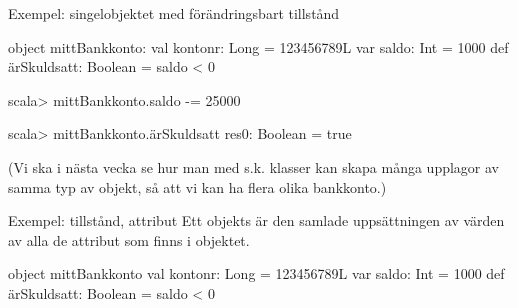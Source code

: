 \begin{Slide}{Exempel: singelobjektet med förändringsbart tillstånd} \SlideFontSmall
\begin{Code}[basicstyle=\ttfamily\fontsize{9}{11}\selectfont]
object mittBankkonto:
  val kontonr: Long        = 123456789L
  var saldo: Int           = 1000
  def ärSkuldsatt: Boolean = saldo < 0
\end{Code}
\begin{REPLnonum}
scala> mittBankkonto.saldo -= 25000

scala> mittBankkonto.ärSkuldsatt
res0: Boolean = true
\end{REPLnonum}

(Vi ska i nästa vecka se hur man med s.k. klasser kan skapa många upplagor av samma  typ av objekt, så att vi kan ha flera olika bankkonto.)
\end{Slide}



\begin{Slide}{Exempel: tillstånd, attribut}
Ett objekts  är den samlade uppsättningen av värden av alla de attribut som finns i objektet.
\begin{Code}[basicstyle=\ttfamily\fontsize{9}{11}\selectfont]
object mittBankkonto
  val kontonr: Long        = 123456789L
  var saldo: Int           = 1000
  def ärSkuldsatt: Boolean = saldo < 0
\end{Code}
\end{Slide}


